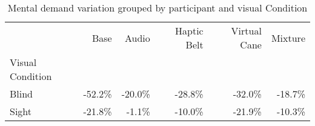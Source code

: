 
\begin{table}[!htb]
\centering
\caption{Mental demand variation grouped by participant and visual Condition}
\label{tab:md_var_average_group}
\begin{tabular}{lrrrrr}
\toprule
{} &    Base &   Audio &  Haptic Belt &  Virtual Cane &  Mixture \\
Visual Condition &         &         &              &               &          \\
\midrule
Blind            & -52.2\% & -20.0\% &      -28.8\% &       -32.0\% &  -18.7\% \\
Sight            & -21.8\% &  -1.1\% &      -10.0\% &       -21.9\% &  -10.3\% \\
\bottomrule
\end{tabular}
\end{table}

